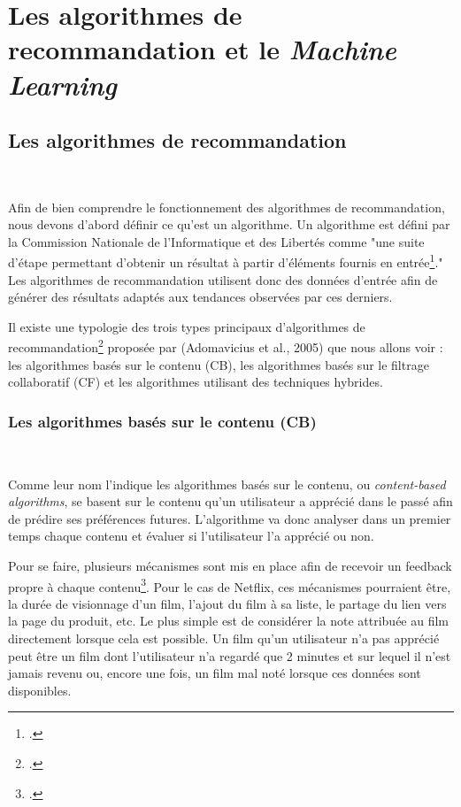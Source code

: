 \documentclass[12pt,a4paper]{article}
\begin{document}
\section{Les algorithmes de recommandation et le \textit{Machine Learning}}
\subsection{Les algorithmes de recommandation}
~

Afin de bien comprendre le fonctionnement des algorithmes de recommandation, nous devons d'abord définir ce qu'est un algorithme. Un algorithme est défini par la Commission Nationale de l'Informatique et des Libertés comme "une suite d'étape permettant d'obtenir un résultat à partir d'éléments fournis en entrée\footcite{cnil_algorithme}." Les algorithmes de recommandation utilisent donc des données d'entrée afin de générer des résultats adaptés aux tendances observées par ces derniers.

Il existe une typologie des trois types principaux d'algorithmes de recommandation\footcite{Adomavicius2005} proposée par (Adomavicius et al., 2005) que nous allons voir : les algorithmes basés sur le contenu (CB), les algorithmes basés sur le filtrage collaboratif (CF) et les algorithmes utilisant des techniques hybrides.

\subsubsection{Les algorithmes basés sur le contenu (CB)}
~

Comme leur nom l'indique les algorithmes basés sur le contenu, ou \textit{content-based algorithms}, se basent sur le contenu qu'un utilisateur a apprécié dans le passé afin de prédire ses préférences futures. L'algorithme va donc analyser dans un premier temps chaque contenu et évaluer si l'utilisateur l'a apprécié ou non. 

Pour se faire, plusieurs mécanismes sont mis en place afin de recevoir un feedback propre à chaque contenu\footcite{Saporta2022}. Pour le cas de Netflix, ces mécanismes pourraient être, la durée de visionnage d'un film, l'ajout du film à sa liste, le partage du lien vers la page du produit, etc. Le plus simple est de considérer la note attribuée au film directement lorsque cela est possible. Un film qu'un utilisateur n'a pas apprécié peut être un film dont l'utilisateur n'a regardé que 2 minutes et sur lequel il n'est jamais revenu ou, encore une fois, un film mal noté lorsque ces données sont disponibles. 
\end{document}
